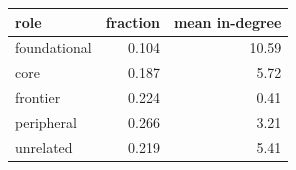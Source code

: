 \begin{tabular}{lrr}
\toprule
role & fraction & mean in-degree \\
\midrule
foundational & 0.104 & 10.59 \\
core & 0.187 & 5.72 \\
frontier & 0.224 & 0.41 \\
peripheral & 0.266 & 3.21 \\
unrelated & 0.219 & 5.41 \\
\bottomrule
\end{tabular}
